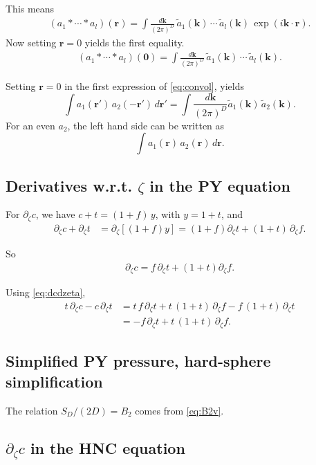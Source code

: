 \documentclass[preprint]{revtex4-1}
\numberwithin{equation}{subsection}
\numberwithin{table}{section}
\newcommand{\vct}[1]{\mathbf{#1}}
\providecommand{\vr}{} %
\renewcommand{\vr}{\vct{r}}
\newcommand{\vk}{\vct{k}}
\newcommand{\dvk}{\frac{d\vk}{(2\pi)^D}}
\begin{document}
This means
\begin{align*}
  (a_1 * \cdots * a_l)(\vr)
= \int \dvk \, \tilde{a}_1(\vk) \, \cdots \, \tilde{a}_l(\vk)
  \, \exp(i\vk\cdot\vr).
\end{align*}
%
Now setting $\vr = 0$ yields the first equality.
\begin{align*}
  (a_1 * \cdots * a_l)(\vct 0)
= \int \dvk \, \tilde{a}_1(\vk) \, \cdots \, \tilde{a}_l(\vk).
\end{align*}

Setting $\vr = 0$ in the first expression of \eqref{eq:convol}, yields
\[
  \int a_1(\vr') \, a_2(-\vr') \, d\vr'
= \int \dvk \tilde{a}_1(\vk) \, \tilde{a}_2(\vk).
\]
For an even $a_2$,
the left hand side can be written as
\[
  \int a_1(\vr) \, a_2(\vr) \, d\vr.
\]



\subsection{Derivatives w.r.t. $\zeta$ in the PY equation}



For $\partial_\zeta c$,
we have $c + t = (1 + f) \, y$,
with $y = 1 + t$,
and
\begin{align*}
\partial_\zeta c
+ \partial_\zeta t
&= \partial_\zeta [(1+f)y]
=
(1 + f) \partial_\zeta t
+ (1 + t) \, \partial_\zeta f.
\end{align*}

So
\begin{align}
\partial_\zeta c
=
f \, \partial_\zeta t
+ (1+t) \partial_\zeta f.
\label{eq:dcdzeta}
\end{align}

Using \eqref{eq:dcdzeta},
\begin{align*}
  t\, \partial_\zeta c - c \, \partial_\zeta t
&=
  t \, f \, \partial_\zeta t
+ t \, (1 + t) \, \partial_\zeta f
- f \, (1 + t) \, \partial_\zeta t
\\
&=
- f \, \partial_\zeta t
+ t \, (1 + t) \, \partial_\zeta f.
\end{align*}


\subsection{Simplified PY pressure, hard-sphere simplification}

The relation $S_D/(2D) = B_2$ comes from \eqref{eq:B2v}.


\subsection{$\partial_\zeta c$ in the HNC equation}
\end{document}
